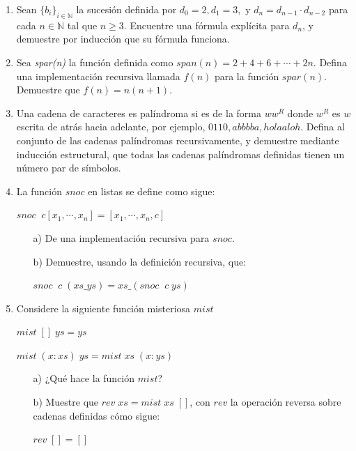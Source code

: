 \documentclass[letterpaper,11pt]{article}
\begin{document}
\begin{enumerate}
    \item Sean $\{b_{i}\}_{i \in ℕ}$ la sucesión definida por $d_{0} = 2, 
    d_{1} = 3, $ y $d_{n} = d_{n-1} \cdot d_{n-2}$ para cada $n \in ℕ$ tal que 
    $n \geq 3$. Encuentre una fórmula explícita para $d_{n}$, y demuestre por 
    inducción que su fórmula funciona.

    \item Sea \textit{spar(n)} la función definida como $span(n) = 2 + 4 + 6 +
    ⋯ + 2n$. Defina una implementación recursiva llamada $f(n)$ para la función 
    $spar(n)$. Demuestre que $f(n) = n(n + 1)$.

    \item Una cadena de caracteres es palíndroma si es de la forma $ww^{R}$ 
    donde $w^{R}$ es $w$ escrita de atrás hacia adelante, por ejemplo, $0110,
    abbbba, holaaloh$. Defina al conjunto de las cadenas palíndromas 
    recursivamente, y demuestre mediante inducción estructural, que todas las 
    cadenas palíndromas definidas tienen un número par de símbolos. 

    \item La función $snoc$ en listas se define como sigue:
    \begin{center}
        $snoc \; \; c[x_{1}, ⋯, x_{n}] = [x_{1}, ⋯, x_{n}, c]$
    \end{center}

    \begin{itemize}
        \item[a)] De una implementación recursiva para $snoc$.
        \item[b)] Demuestre, usando la definición recursiva, que:
        \begin{center}
            $snoc \; \; c \; (xs\_ys) = xs\_ (snoc \; \; c \; ys)$
        \end{center} 
    \end{itemize}

    \item Considere la siguiente función misteriosa $mist$
    \begin{center}
        $mist \; [] \; ys = ys$

        $mist \; (x : xs) \;  ys = mist \; xs \; (x : ys)$
    \end{center}

    \begin{itemize}
        \item[a)] ¿Qué hace la función $mist$?
        \item[b)] Muestre que $rev \; xs = mist \; xs \; []$, con $rev$ la 
        operación reversa sobre cadenas definidas cómo sigue: 
        \begin{center}
            $rev \; [] = []$


\end{center}
\end{itemize}
\end{enumerate}
\end{document}
